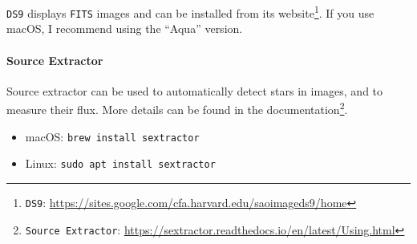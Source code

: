 \documentclass[a4paper, 11pt, fleqn]{memoir}
\begin{document}
\texttt{DS9} displays \texttt{FITS} images and can be installed from its website\footnote{\texttt{DS9}: \url{https://sites.google.com/cfa.harvard.edu/saoimageds9/home}}.
If you use macOS, I recommend using the \enquote{Aqua} version.

\paragraph*{Source Extractor}
Source extractor can be used to automatically detect stars in images, and to measure their flux.
More details can be found in the documentation\footnote{\texttt{Source Extractor}: \url{https://sextractor.readthedocs.io/en/latest/Using.html}}.
\begin{itemize}
    \item macOS: \texttt{brew install sextractor}
    \item Linux: \texttt{sudo apt install sextractor}
\end{itemize}








\end{document}
